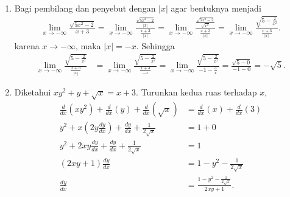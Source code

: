 \documentclass[11pt,openany,a4paper]{article}
\begin{document}
\begin{enumerate}
\begin{enumerate}
\begin{center}
                    \end{center}
          \end{enumerate}
    \item Bagi pembilang dan penyebut dengan $|x|$ agar bentuknya menjadi
          \begin{align*}
              \lim_{x \to -\infty} \frac{\sqrt{5x^2 - 2}}{x+3}= \lim_{x \to -\infty} \frac{\frac{\sqrt{5x^2 - 2}}{|x|}}{\frac{x+3}{|x|}} = \lim_{x \to -\infty} \frac{\frac{\sqrt{5x^2 - 2}}{\sqrt{x^2}}}{\frac{x+3}{|x|}} = \lim_{x \to -\infty} \frac{\sqrt{5 - \frac{2}{x^2}}}{\frac{x+3}{|x|}}.
          \end{align*}
          karena $x \to -\infty$, maka $|x| = -x$. Sehingga
          \begin{align*}
              \lim_{x \to -\infty} \frac{\sqrt{5 - \frac{2}{x^2}}}{\frac{x+3}{|x|}} & = \lim_{x \to -\infty} \frac{\sqrt{5 - \frac{2}{x^2}}}{\frac{x+3}{-x}}= \lim_{x \to -\infty} \frac{\sqrt{5 - \frac{2}{x^2}}}{-1 - \frac{3}{x}} = \frac{\sqrt{5 - 0}}{-1 - 0}                                            =-\sqrt{5}.
          \end{align*}
    \item Diketahui $xy^2 + y + \sqrt{x} = x + 3$. Turunkan kedua ruas terhadap $x$,
          \begin{align*}
              \frac{d}{dx}(xy^2) + \frac{d}{dx}(y) + \frac{d}{dx}(\sqrt{x})   & = \frac{d}{dx}(x) + \frac{d}{dx}(3)              \\
              y^2 + x(2y \frac{dy}{dx}) + \frac{dy}{dx} + \frac{1}{2\sqrt{x}} & = 1 + 0                                          \\
              y^2 + 2xy \frac{dy}{dx} + \frac{dy}{dx} + \frac{1}{2\sqrt{x}}   & = 1                                              \\
              (2xy + 1) \frac{dy}{dx}                                         & = 1 - y^2 - \frac{1}{2\sqrt{x}}                  \\
              \frac{dy}{dx}                                                   & = \frac{1 - y^2 - \frac{1}{2\sqrt{x}}}{2xy + 1}.

\end{align*}
\end{enumerate}
\end{document}
